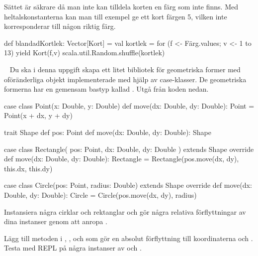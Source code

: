 \SOLUTION

\TaskSolved \what

\SubtaskSolved  Sättet är säkrare då man inte kan tilldela korten en färg som inte finns. Med heltalskonstanterna kan man till exempel ge ett kort färgen 5, vilken inte korresponderar till någon riktig färg.

\SubtaskSolved  {}

\SubtaskSolved
\begin{Code}
def blandadKortlek: Vector[Kort] = {
  val kortlek =
    for (f <- Färg.values; v <- 1 to 13) yield Kort(f,v)
  scala.util.Random.shuffle(kortlek)
}
\end{Code}

\SubtaskSolved  {}

\QUESTEND








\QUESTBEGIN

\Task  \what~  Du ska i denna uppgift skapa ett litet bibliotek för geometriska former med oföränderliga objekt implementerade med hjälp av case-klasser. De geometriska formerna har en gemensam bastyp kallad . Utgå från koden nedan.

\begin{Code}
case class Point(x: Double, y: Double) {
  def move(dx: Double, dy: Double): Point = Point(x + dx, y + dy)
}

trait Shape {
  def pos: Point
  def move(dx: Double, dy: Double): Shape
}

case class Rectangle(
  pos: Point,
  dx: Double,
  dy: Double
) extends Shape {
  override def move(dx: Double, dy: Double): Rectangle =
    Rectangle(pos.move(dx, dy), this.dx, this.dy)
}

case class Circle(pos: Point, radius: Double) extends Shape {
  override def move(dx: Double, dy: Double): Circle =
    Circle(pos.move(dx, dy), radius)
}
\end{Code}

\Subtask Instansiera några cirklar och rektanglar och gör några relativa förflyttningar av dina instanser genom att anropa .

\Subtask Lägg till metoden  i , ,  och  som gör en absolut förflyttning till koordinaterna  och . Testa med REPL på några instanser av  och .

